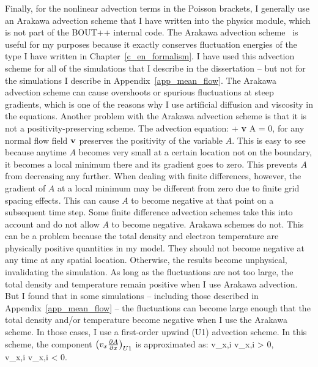 Finally, for the nonlinear advection terms in the Poisson brackets, I generally use an Arakawa advection scheme that I have written into the physics module, which is not part of the BOUT++ internal
code. The Arakawa advection scheme~\cite{arakawa1966} is useful for my purposes because it exactly conserves fluctuation energies of the type I have written in Chapter~\ref{c_en_formalism}.
I have used this advection scheme for all of the simulations that I describe in the dissertation -- but not for the simulations I describe in Appendix~\ref{app_mean_flow}. 
The Arakawa advection scheme can cause overshoots
or spurious fluctuations at steep gradients, which is one of the reasons why I use artificial diffusion and viscosity in the equations. Another problem with the Arakawa advection scheme
is that it is not a positivity-preserving scheme. The advection equation:
\beq
\label{advec_eqn}
 + {\bf v} \cdot \grad A = 0,
\eeq
for any normal flow field ${\bf v}$ preserves the positivity of the variable $A$. This is easy to see because anytime $A$ becomes very small at a certain
location not on the boundary, it becomes a local minimum there and its gradient goes to zero. This prevents $A$ from decreasing any further. When dealing with finite differences, however,
the gradient of $A$ at a local minimum may be different from zero due to finite grid spacing effects. This can cause $A$ to become negative at that point on a subsequent time step. Some finite
difference advection schemes take this into account and do not allow $A$ to become negative. Arakawa schemes do not. This can be a problem because the total density and electron temperature
are physically positive quantities in my model. They should not become negative at any time at any spatial location. Otherwise, the results
become unphysical, invalidating the simulation. As long as the fluctuations are not too large, the total density and temperature remain positive when I use Arakawa advection. But I found
that in some simulations -- including those described in Appendix~\ref{app_mean_flow} -- 
the fluctuations can become large enough that the total density and/or temperature become negative when I use the Arakawa scheme.
In those cases, I use a first-order upwind (U1) advection scheme. In this scheme, the component $\left( v_x \frac{\partial A}{\partial x} \right)_{U1}$ is approximated as:
\beqar
\label{upwind_def}
v_{x,i}   \quad v_{x,i} > 0, \nonumber \\
v_{x,i}   \quad v_{x,i} < 0.
\eeqar

